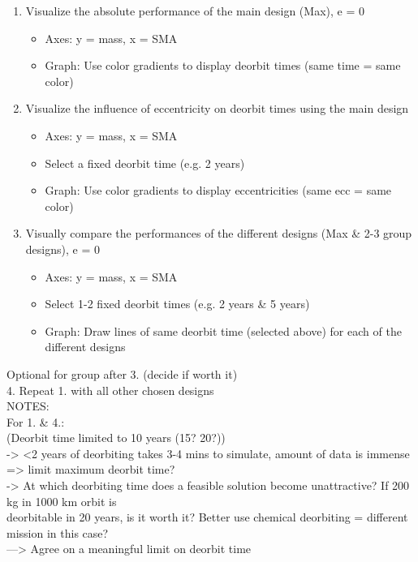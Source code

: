 \begin{enumerate}
		\item Visualize the absolute performance of the main design (Max), e = 0 \\
				\begin{itemize}
						\item Axes: y = mass, x = SMA \\
						\item Graph: Use color gradients to display deorbit times (same time = same color)
				\end{itemize}
				\item  Visualize the influence of eccentricity on deorbit times using the main design \\
				\begin{itemize}
						\item Axes: y = mass, x = SMA \\
						\item Select a fixed deorbit time (e.g. 2 years) \\
						\item Graph: Use color gradients to display eccentricities (same ecc = same color)
				\end{itemize}
				\item Visually compare the performances of the different designs (Max \& 2-3 group designs), e = 0 
				\begin{itemize}
						\item Axes: y = mass, x = SMA \\
						\item Select 1-2 fixed deorbit times (e.g. 2 years \& 5 years) \\
						\item Graph: Draw lines of same deorbit time (selected above) for each of the different designs
				\end{itemize}				
\end{enumerate}
Optional for group after 3. (decide if worth it)\\
4. Repeat 1. with all other chosen designs\\

NOTES: \\

For 1. \& 4.:\\
(Deorbit time limited to 10 years (15? 20?)) \\
-> <2 years of deorbiting takes 3-4 mins to simulate, amount of data is immense => limit maximum deorbit time? \\
-> At which deorbiting time does a feasible solution become unattractive? If 200 kg in 1000 km orbit is \\
   deorbitable in 20 years, is it worth it? Better use chemical deorbiting = different mission in this case? \\
---> Agree on a meaningful limit on deorbit time \\

